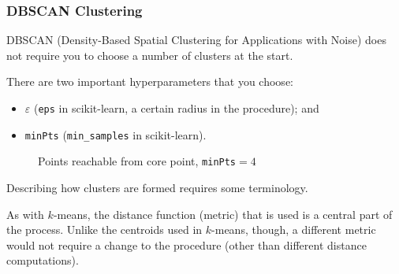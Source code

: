 \documentclass[smaller]{beamer}
\theoremstyle{example}
\newcommand{\ttt}[1]{{\small\texttt{#1}}}
\begin{document}
\begin{frame}[fragile]
    \frametitle{DBSCAN Clustering}
    DBSCAN (Density-Based Spatial Clustering for Applications with Noise) does not require you to choose a number of clusters at the start.
    
    \pause 
    There are two important hyperparameters that you choose: 
    \begin{itemize}
        \item $\varepsilon$ (\ttt{eps} in scikit-learn, a certain radius in the procedure); and 
        \pause
        \item \ttt{minPts} (\lstinline[language=Python,basicstyle=\ttfamily]{min_samples} in scikit-learn).
    \end{itemize}

    \begin{minipage}{\textwidth}
    \begin{figure}
        \vspace{-\baselineskip}
        \caption{Points reachable from core point, \ttt{minPts}$=4$}
    \end{figure}

    \pause
    \vspace{\baselineskip}
    Describing how clusters are formed requires some terminology. 
    
    \pause
    As with $k$-means, the distance function (metric) that is used is a central part of the process. Unlike the centroids used in $k$-means, though, a different metric would not require a change to the procedure (other than different distance computations). 
    \end{minipage}
\end{frame}
\end{document}
